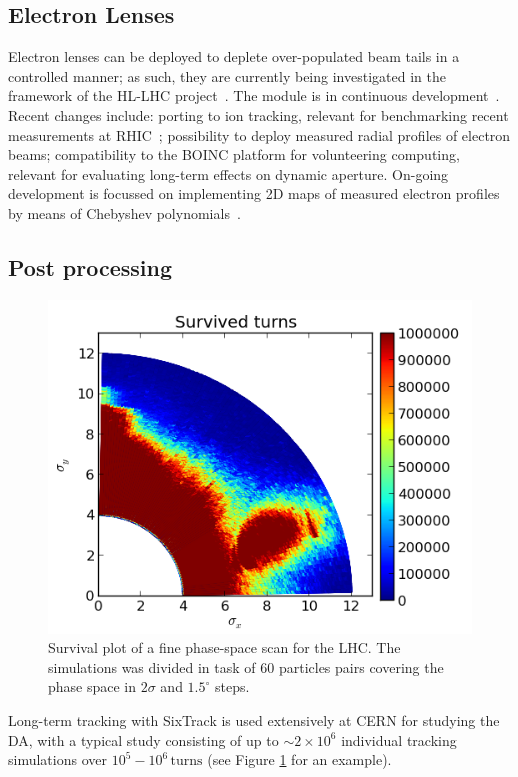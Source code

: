 \documentclass[a4paper,
              ]{jacow}
\begin{document}
\subsection{Electron Lenses}
Electron lenses can be deployed to deplete over-populated beam tails in a controlled manner; as such, they are currently being investigated in the framework of the HL-LHC project~\cite{HL-TDR}. The module is in continuous development~\cite{elens-miriam}. Recent changes include: porting to ion tracking, relevant for benchmarking recent measurements at RHIC~\cite{RHIC-Mirarchi}; possibility to deploy measured radial profiles of electron beams; compatibility to the BOINC platform for volunteering computing, relevant for evaluating long-term effects on dynamic aperture. On-going development is focussed on implementing 2D maps of measured electron profiles by means of Chebyshev polynomials~\cite{GStancari-Chebyshev}.

\subsection{Post processing}
\begin{figure}[tbh]
\centering
 \includegraphics[width=\columnwidth]{surv_plot1.png}
 \caption{Survival plot of a fine phase-space scan for the LHC. The simulations was divided in task of $60$ particles pairs covering the phase space in $2\sigma$ and $1.5^\circ$ steps.}
 \label{fig:study}
\end{figure}

Long-term tracking with SixTrack is used extensively at CERN for studying the DA, with a typical study consisting of up to $\sim 2\times 10^{6}$ individual tracking simulations over $10^5-10^6\,\mathrm{turns}$ (see Figure \ref{fig:study} for an example).
\end{document}
